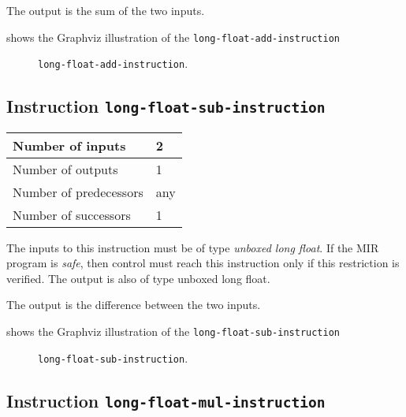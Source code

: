 The output is the sum of the two inputs.

 shows the Graphviz illustration of the
\texttt{long-float-add-instruction}

\begin{figure}
\begin{center}
\end{center}
\caption{\label{fig-long-float-add-instruction}
\texttt{long-float-add-instruction}.}
\end{figure}

\subsection{Instruction \texttt{long-float-sub-instruction}}
\label{mir-instruction-long-float-sub}

\begin{tabular}{|l|l|}
\hline
Number of inputs & 2\\
\hline
Number of outputs & 1\\
\hline
Number of predecessors & any\\
\hline
Number of successors & 1\\
\hline
\end{tabular}

The inputs to this instruction must be of type \emph{unboxed long
  float}.  If the MIR program is \emph{safe}, then control must reach
this instruction only if this restriction is verified.  The output is
also of type unboxed long float.

The output is the difference between the two inputs.

 shows the Graphviz illustration of the
\texttt{long-float-sub-instruction}

\begin{figure}
\begin{center}
\end{center}
\caption{\label{fig-long-float-sub-instruction}
\texttt{long-float-sub-instruction}.}
\end{figure}

\subsection{Instruction \texttt{long-float-mul-instruction}}
\label{mir-instruction-long-float-mul}

